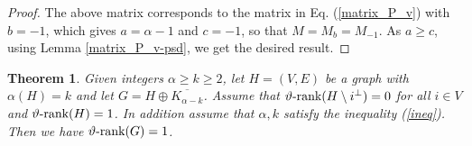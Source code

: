 \documentclass[11pt]{article}
\newtheorem{theorem}{Theorem}[section]
\numberwithin{equation}{section}
\newcommand{\rrank}{\vartheta\text{\rm -rank}}
\begin{document}
\begin{proof}
The above matrix corresponds to the matrix   in Eq. (\ref{matrix_P_v}) with $b=-1$, which gives $a=\alpha-1$ and $c=-1$, so that  $M=M_b=M_{-1}$. As $a\ge c$, using   Lemma \ref{matrix_P_v-psd}, we get the desired result.
\end{proof}

\begin{theorem}\label{adding_iso}
Given integers $\alpha\ge k\ge 2$, let $H=(V,E)$ be a graph with $\alpha(H)=k$ and let $G=H\oplus \overline{K_{\alpha-k}}$.
Assume that  $\rrank(H\setminus i^\perp)=0$ for all $i\in V$ and $\rrank(H)=1$. 
In addition assume that $\alpha,k$ satisfy the inequality (\ref{ineq}). Then we have $\rrank(G)= 1$.
\end{theorem}
\end{document}
